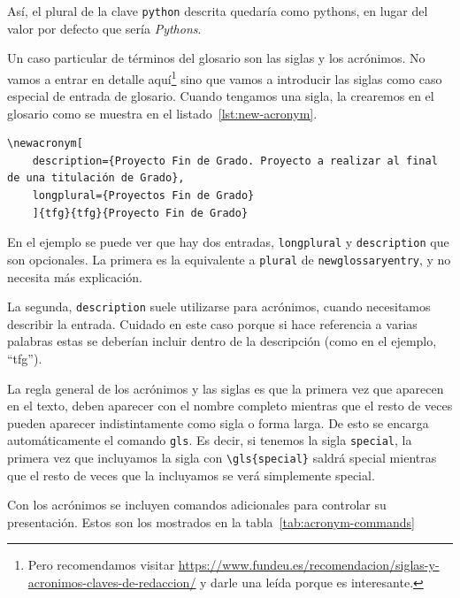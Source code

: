 Así, el plural de la clave \texttt{python} descrita quedaría como \glspl{python}, en lugar del valor por defecto que sería \textit{Pythons}.

Un caso particular de términos del glosario son las siglas y los acrónimos. No vamos a entrar en detalle aquí\footnote{Pero recomendamos visitar \href{https://www.fundeu.es/recomendacion/siglas-y-acronimos-claves-de-redaccion/}{https://www.fundeu.es/recomendacion/siglas-y-acronimos-claves-de-redaccion/} y darle una leída porque es interesante.} sino que vamos a introducir las siglas como caso especial de entrada de glosario. Cuando tengamos una sigla, la crearemos en el glosario como se muestra en el listado~\ref{lst:new-acronym}.

\begin{lstlisting}[language={[latex]TeX},caption=Entrada genérica de una sigla o acrónimo en el glosario,label=lst:new-acronym]
\newacronym[
    description={Proyecto Fin de Grado. Proyecto a realizar al final de una titulación de Grado},
    longplural={Proyectos Fin de Grado}
    ]{tfg}{tfg}{Proyecto Fin de Grado}
\end{lstlisting}

En el ejemplo se puede ver que hay dos entradas, \texttt{longplural} y \texttt{description} que son opcionales. La primera es la equivalente a \texttt{plural} de \texttt{newglossaryentry}, y no necesita más explicación.

La segunda, \texttt{description} suele utilizarse para acrónimos, cuando necesitamos describir la entrada. Cuidado en este caso porque si hace referencia a varias palabras estas se deberían incluir dentro de la descripción (como en el ejemplo, \enquote{\acrlong{tfg}}).

La regla general de los acrónimos y las siglas es que la primera vez que aparecen en el texto, deben aparecer con el nombre completo mientras que el resto de veces pueden aparecer indistintamente como sigla o forma larga. De esto se encarga automáticamente el comando \texttt{gls}. Es decir, si tenemos la sigla \texttt{special}, la primera vez que incluyamos la sigla con \texttt{\textbackslash gls\{special\}} saldrá \gls{special} mientras que el resto de veces que la incluyamos se verá simplemente \gls{special}.

Con los acrónimos se incluyen comandos adicionales para controlar su presentación. Estos son los mostrados en la tabla~\ref{tab:acronym-commands}

